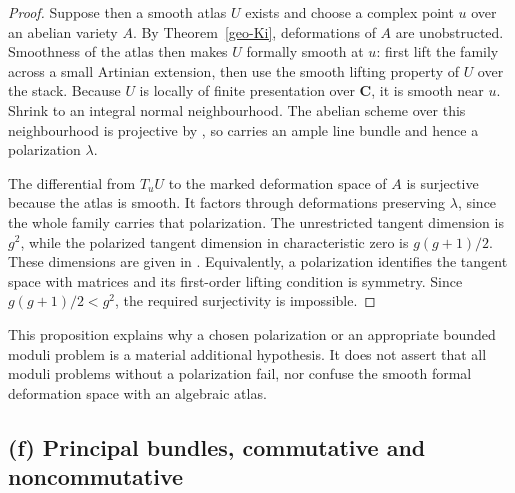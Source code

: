 \begin{proof}
Suppose then a smooth atlas $U$ exists and choose a complex point $u$ over an
abelian variety $A$. By Theorem~\ref{geo-Ki}, deformations of $A$ are
unobstructed. Smoothness of the atlas then makes $U$ formally smooth at
$u$: first lift the family across a small Artinian extension, then use the
smooth lifting property of $U$ over the stack. Because $U$ is locally of
finite presentation over $\mathbf C$, it is smooth near $u$. Shrink to an
integral normal neighbourhood. The abelian scheme over this neighbourhood
is projective by \cite[\S3(C), p.~258]{Murre1965}, so carries an ample
line bundle and hence a polarization $\lambda$.

The differential from $T_uU$ to the marked deformation space of $A$ is
surjective because the atlas is smooth. It factors through deformations
preserving $\lambda$, since the whole family carries that polarization.
The unrestricted tangent dimension is $g^2$, while the polarized tangent
dimension in characteristic zero is $g(g+1)/2$.
These dimensions are given in \cite[\S2.2, Theorem 2.2.1;
\S2.4, Theorem 2.4.1 and its proof]{Oort1971}.
Equivalently, a polarization identifies the tangent space with matrices
and its first-order lifting condition is symmetry. Since
$g(g+1)/2<g^2$, the required surjectivity is impossible.
\end{proof}

This proposition explains why a chosen polarization or an appropriate
bounded moduli problem is a material additional hypothesis. It does not
assert that all moduli problems without a polarization fail, nor confuse
the smooth formal deformation space with an algebraic atlas.

\subsection{(f) Principal bundles, commutative and noncommutative}

